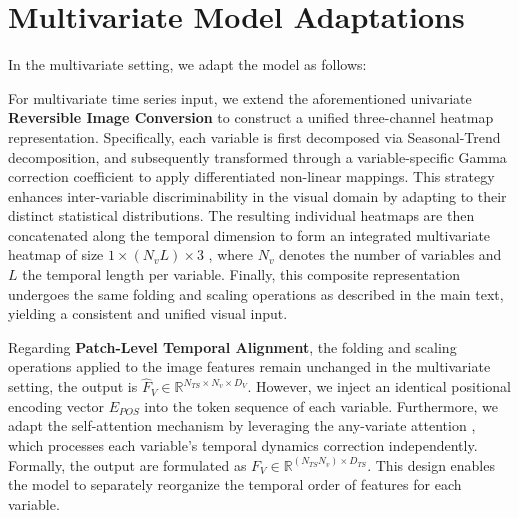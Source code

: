\documentclass{article}
\theoremstyle{plain}
\theoremstyle{definition}
\theoremstyle{remark}
\begin{document}
\nocite{langley00}





\newpage
\appendix
\onecolumn

\section{Multivariate Model Adaptations}\label{appendix:Multivariate}
In the multivariate setting, we adapt the model as follows:

For multivariate time series input, we extend the aforementioned univariate \textbf{Reversible Image Conversion} to construct a unified three-channel heatmap representation. Specifically, each variable is first decomposed via Seasonal-Trend decomposition, and subsequently transformed through a variable-specific Gamma correction coefficient to apply differentiated non-linear mappings. This strategy enhances inter-variable discriminability in the visual domain by adapting to their distinct statistical distributions. The resulting individual heatmaps are then concatenated along the temporal dimension to form an integrated multivariate heatmap of size $ 1 \times (N_v L) \times 3 $ , where   $ N_v $  denotes the number of variables and $ L $ the temporal length per variable. Finally, this composite representation undergoes the same folding and scaling operations as described in the main text, yielding a consistent and unified visual input.

Regarding \textbf{Patch-Level Temporal Alignment}, the folding and scaling operations applied to the image features remain unchanged in the multivariate setting, the output is $\hat{F}_{V} \in \mathbb{R}^{N_{TS} \times N_v \times D_V}$. However, we inject an identical positional encoding vector $E_{POS}$ into the token sequence of each variable. Furthermore, we adapt the self-attention mechanism by leveraging the any-variate attention \cite{woo2024moirai}, which processes each variable’s temporal dynamics correction independently. Formally, the output are formulated as  $ F_{V} \in \mathbb{R}^{(N_{TS} N_v) \times D_{TS}} $. This design enables the model to separately reorganize the temporal order of features for each variable.
\end{document}
